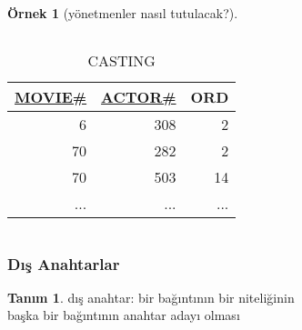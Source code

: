 \documentclass[dvipsnames]{beamer}
\theoremstyle{definition}
\newtheorem{tanim}[theorem]{Tanım}
\theoremstyle{example}
\newtheorem{ornek}[theorem]{Örnek}
\theoremstyle{plain}
\begin{document}
\begin{frame}
\begin{ornek}[yönetmenler nasıl tutulacak?]
\begin{columns}[t]
      \begin{tiny}
      \begin{table}
        \caption{CASTING}
        \begin{tabular}{|r|r|r|}\hline
\underline{MOVIE\#} & \underline{ACTOR\#} & ORD\\[2pt]\hline\hline
                  6 &                 308 &   2\\\hline
                 70 &                 282 &   2\\\hline
                 70 &                 503 &  14\\\hline
                ... &                 ... & ...\\\hline
        \end{tabular}
      \end{table}
      \end{tiny}
    \end{columns}
  \end{ornek}
\end{frame}

\begin{frame}
  \frametitle{Dış Anahtarlar}

  \begin{tanim}
    \alert{dış anahtar}: bir bağıntının bir niteliğinin\\
      başka bir bağıntının anahtar adayı olması
  \end{tanim}
\end{frame}
\end{document}

